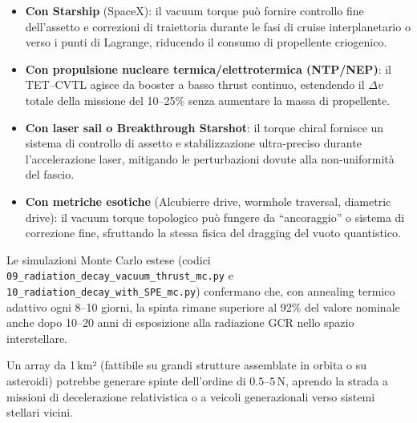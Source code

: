 \documentclass[11pt,a4paper]{article}
\theoremstyle{plain}
\theoremstyle{definition}
\begin{document}
\vspace{0.2cm}

\begin{itemize}
    \item \textbf{Con Starship} (SpaceX): il vacuum torque può fornire controllo fine dell’assetto e correzioni di traiettoria durante le fasi di cruise interplanetario o verso i punti di Lagrange, riducendo il consumo di propellente criogenico.



    \vspace{0.1cm}
    \item \textbf{Con propulsione nucleare termica/elettrotermica (NTP/NEP)}: il TET--CVTL agisce da booster a basso thrust continuo, estendendo il $\Delta v$ totale della missione del 10–25\% senza aumentare la massa di propellente.

    \vspace{0.1cm}
    \item \textbf{Con laser sail o Breakthrough Starshot}: il torque chiral fornisce un sistema di controllo di assetto e stabilizzazione ultra-preciso durante l’accelerazione laser, mitigando le perturbazioni dovute alla non-uniformità del fascio.


    \vspace{0.1cm}
    \item \textbf{Con metriche esotiche} (Alcubierre drive, wormhole traversal, diametric drive): il vacuum torque topologico può fungere da “ancoraggio” o sistema di correzione fine, sfruttando la stessa fisica del dragging del vuoto quantistico.
\end{itemize}

\vspace{0.2cm}

Le simulazioni Monte Carlo estese (codici \texttt{09\_radiation\_decay\_vacuum\_thrust\_mc.py} e \texttt{10\_radiation\_decay\_with\_SPE\_mc.py}) confermano che, con annealing termico adattivo ogni 8–10 giorni, la spinta rimane superiore al 92\% del valore nominale anche dopo 10–20 anni di esposizione alla radiazione GCR nello spazio interstellare.

\vspace{0.3cm}

Un array da 1\,km² (fattibile su grandi strutture assemblate in orbita o su asteroidi) potrebbe generare spinte dell’ordine di $0.5$–$5$\,N, aprendo la strada a missioni di decelerazione relativistica o a veicoli generazionali verso sistemi stellari vicini. 
\end{document}
